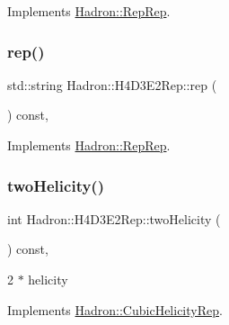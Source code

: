 Implements \mbox{\hyperlink{structHadron_1_1RepRep_ab3213025f6de249f7095892109575fde}{Hadron\+::\+Rep\+Rep}}.

\mbox{\label{structHadron_1_1H4D3E2Rep_a11d0a71e415f309565e9ca158248aa60}} 
\subsubsection{\texorpdfstring{rep()}{rep()}\hspace{0.1cm}{\footnotesize\ttfamily [5/5]}}
{\footnotesize\ttfamily std\+::string Hadron\+::\+H4\+D3\+E2\+Rep\+::rep (\begin{DoxyParamCaption}{ }\end{DoxyParamCaption}) const\hspace{0.3cm}{\ttfamily [inline]}, {\ttfamily [virtual]}}



Implements \mbox{\hyperlink{structHadron_1_1RepRep_ab3213025f6de249f7095892109575fde}{Hadron\+::\+Rep\+Rep}}.

\mbox{\label{structHadron_1_1H4D3E2Rep_ad32976f01733eae853ca8ec5fa040b10}} 
\subsubsection{\texorpdfstring{twoHelicity()}{twoHelicity()}\hspace{0.1cm}{\footnotesize\ttfamily [1/3]}}
{\footnotesize\ttfamily int Hadron\+::\+H4\+D3\+E2\+Rep\+::two\+Helicity (\begin{DoxyParamCaption}{ }\end{DoxyParamCaption}) const\hspace{0.3cm}{\ttfamily [inline]}, {\ttfamily [virtual]}}

2 $\ast$ helicity 

Implements \mbox{\hyperlink{structHadron_1_1CubicHelicityRep_af507aa56fc2747eacc8cb6c96db31ecc}{Hadron\+::\+Cubic\+Helicity\+Rep}}.

\mbox{\label{structHadron_1_1H4D3E2Rep_ad32976f01733eae853ca8ec5fa040b10}} 
